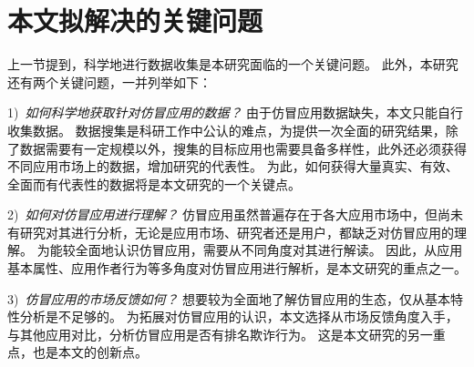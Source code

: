 %
%
%

\section{本文拟解决的关键问题}
上一节提到，科学地进行数据收集是本研究面临的一个关键问题。
此外，本研究还有两个关键问题，一并列举如下：

1)\	\emph{如何科学地获取针对仿冒应用的数据？} \quad
由于仿冒应用数据缺失，本文只能自行收集数据。
数据搜集是科研工作中公认的难点，为提供一次全面的研究结果，除了数据需要有一定规模以外，搜集的目标应用也需要具备多样性，此外还必须获得不同应用市场上的数据，增加研究的代表性。
为此，如何获得大量真实、有效、全面而有代表性的数据将是本文研究的一个关键点。

2)\	\emph{如何对仿冒应用进行理解？} \quad
仿冒应用虽然普遍存在于各大应用市场中，但尚未有研究对其进行分析，无论是应用市场、研究者还是用户，都缺乏对仿冒应用的理解。
为能较全面地认识仿冒应用，需要从不同角度对其进行解读。
因此，从应用基本属性、应用作者行为等多角度对仿冒应用进行解析，是本文研究的重点之一。

3)\ \emph{仿冒应用的市场反馈如何？} \quad
想要较为全面地了解仿冒应用的生态，仅从基本特性分析是不足够的。
为拓展对仿冒应用的认识，本文选择从市场反馈角度入手，与其他应用对比，分析仿冒应用是否有排名欺诈行为。
这是本文研究的另一重点，也是本文的创新点。

